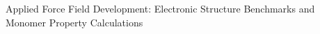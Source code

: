 \begin{chapter}{
Applied Force Field Development: Electronic Structure Benchmarks and
Monomer Property Calculations
}
\label{ch:workflow}



%







\end{chapter}
